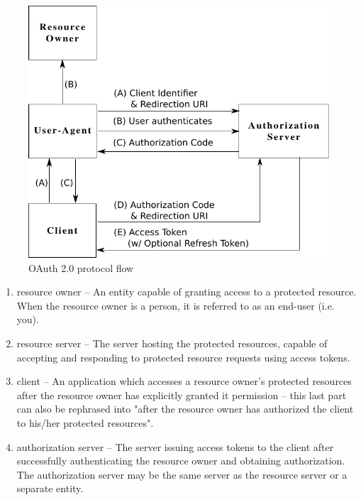 \documentclass[a4paper]{llncs}
\begin{document}
\begin{figure}[htb]
  \centering
  \includegraphics[width=\textwidth]{Oauth2.pdf}
  \caption{OAuth 2.0 protocol flow}
  \label{fig:oauth2flow}
\end{figure}

\begin{enumerate}
\item resource owner -- An entity capable of granting access to a protected resource. When the resource owner is a person, it is referred to as an end-user (i.e. you).

\item resource server -- The server hosting the protected resources, capable of accepting and responding to protected resource requests using access tokens.

\item client -- An application which accesses a resource owner's protected resources after the resource owner has explicitly granted it permission -- this last part can also be rephrased into "after the resource owner has authorized the client to his/her protected resources".

\item authorization server -- The server issuing access tokens to the client after successfully authenticating the resource owner and obtaining authorization. The authorization server may be the same server as the resource server or a separate entity.
\end{enumerate}
\end{document}
